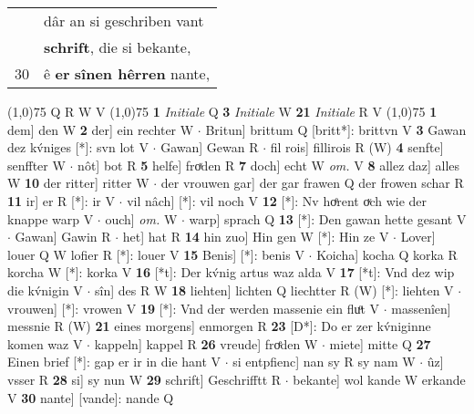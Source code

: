 \documentclass[8pt,a4paper,notitlepage]{article}
\begin{document}
\begin{table}[ht]
\begin{minipage}[t]{0.5\linewidth}
\begin{tabular}{rl}
 & dâr an si geschriben vant\\ 
 & \textbf{schrift}, die si bekante,\\ 
30 & ê \textbf{er} \textbf{sînen hêrren} nante,\\ 
\end{tabular}
\scriptsize
\line(1,0){75} \newline
Q R W V \newline
\line(1,0){75} \newline
\textbf{1} \textit{Initiale} Q  \textbf{3} \textit{Initiale} W  \textbf{21} \textit{Initiale} R V  \newline
\line(1,0){75} \newline
\textbf{1} dem] den W \textbf{2} der] ein rechter W  $\cdot$ Britun] brittum Q [britt*]: brittvn V \textbf{3} Gawan dez kv́niges [*]: svn lot  V  $\cdot$ Gawan] Gewan R  $\cdot$ fil rois] fillirois R (W) \textbf{4} senfte] senffter W  $\cdot$ nôt] bot R \textbf{5} helfe] froͯden R \textbf{7} doch] echt W \textit{om.} V \textbf{8} allez daz] alles W \textbf{10} der ritter] ritter W  $\cdot$ der vrouwen gar] der gar frawen Q der frowen schar R \textbf{11} ir] er R [*]: ir V  $\cdot$ vil nâch] [*]: vil noch V \textbf{12} [*]: Nv hoͤrent oͮch wie der knappe warp V  $\cdot$ ouch] \textit{om.} W  $\cdot$ warp] sprach Q \textbf{13} [*]: Den gawan hette gesant V  $\cdot$ Gawan] Gawin R  $\cdot$ het] hat R \textbf{14} hin zuo] Hin gen W [*]: Hin ze V  $\cdot$ Lover] louer Q W lofier R [*]: louer V \textbf{15} Benis] [*]: benis V  $\cdot$ Koicha] kocha Q korka R korcha W [*]: korka V \textbf{16} [*t]: Der kv́nig artus waz alda V \textbf{17} [*t]: Vnd dez wip die kv́nigin V  $\cdot$ sîn] des R W \textbf{18} liehten] lichten Q liechtter R (W) [*]: liehten  V  $\cdot$ vrouwen] [*]: vrowen V \textbf{19} [*]: Vnd der werden massenie ein fluͦt V  $\cdot$ massenîen] messnie R (W) \textbf{21} eines morgens] enmorgen R \textbf{23} [D*]: Do er zer kv́niginne komen waz V  $\cdot$ kappeln] kappel R \textbf{26} vreude] froͤden W  $\cdot$ miete] mitte Q \textbf{27} Einen brief [*]: gap er ir in die hant V  $\cdot$ si entpfienc] nan sy R sy nam W  $\cdot$ ûz] vsser R \textbf{28} si] sy nun W \textbf{29} schrift] Geschrifftt R  $\cdot$ bekante] wol kande W erkande V \textbf{30} nante] [vande]: nande Q \newline
\end{minipage}
\end{table}
\end{document}
